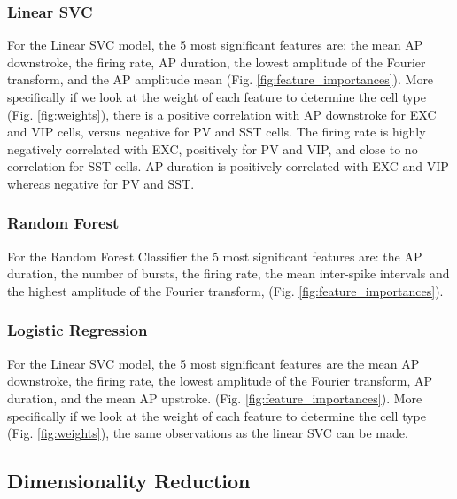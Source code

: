 \documentclass{IEEEtran}
\begin{document}
\subsubsection{Linear SVC}
For the Linear SVC model, the 5 most significant features are: the mean AP downstroke, the firing rate, AP duration, the lowest amplitude of the Fourier transform, and the AP amplitude mean (Fig. \ref{fig:feature_importances}).
More specifically if we look at the weight of each feature to determine the cell type (Fig. \ref{fig:weights}), there is a positive correlation with AP downstroke for EXC and VIP cells, versus negative for PV and SST cells. The firing rate is highly negatively correlated with EXC, positively for PV and VIP, and close to no correlation for SST cells. AP duration is positively correlated with EXC and VIP whereas negative for PV and SST.

\subsubsection{Random Forest}
For the Random Forest Classifier the 5 most significant features are: the AP duration, the number of bursts, the firing rate, the mean inter-spike intervals and the highest amplitude of the Fourier transform, (Fig. \ref{fig:feature_importances}).

\subsubsection{Logistic Regression}
For the Linear SVC model, the 5 most significant features are the mean AP downstroke, the firing rate, the lowest amplitude of the Fourier transform, AP duration, and the mean AP upstroke.
(Fig. \ref{fig:feature_importances}).
More specifically if we look at the weight of each feature to determine the cell type (Fig. \ref{fig:weights}), the same observations as the linear SVC can be made.


\subsection{Dimensionality Reduction}
\end{document}
